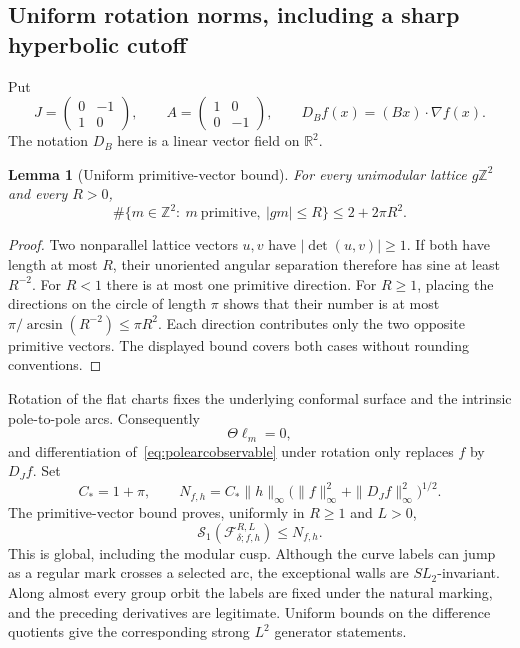 \documentclass[11pt,a4paper]{article}
\numberwithin{equation}{section}
\newtheorem{lemma}[theorem]{Lemma}
\theoremstyle{definition}
\theoremstyle{remark}
\newcommand{\RR}{\mathbb R}
\newcommand{\ZZ}{\mathbb Z}
\begin{document}
\subsection{Uniform rotation norms, including a sharp hyperbolic cutoff}
\label{subsec:polearcnorms}

Put
\[
 J=\begin{pmatrix}0&-1\\1&0\end{pmatrix},\qquad
 A=\begin{pmatrix}1&0\\0&-1\end{pmatrix},\qquad
 D_Bf(x)=(Bx)\cdot\nabla f(x).
\]
The notation $D_B$ here is a linear vector field on $\RR^2$.

\begin{lemma}[Uniform primitive-vector bound]
\label{lem:polearcprimitivebound}
For every unimodular lattice $g\ZZ^2$ and every $R>0$,
\begin{equation}
 \#\{m\in\ZZ^2:\ m\ \mathrm{primitive},\ |gm|\leq R\}
 \leq 2+2\pi R^2.
 \label{eq:polearcprimitivebound}
\end{equation}
\end{lemma}

\begin{proof}
Two nonparallel lattice vectors $u,v$ have $|\det(u,v)|\geq1$.
If both have length at most $R$, their unoriented angular separation
therefore has sine at least $R^{-2}$. For $R<1$ there is at most one
primitive direction. For $R\geq1$, placing the directions on the circle
of length $\pi$ shows that their number is at most
$\pi/\arcsin(R^{-2})\leq\pi R^2$. Each direction contributes only
the two opposite primitive vectors. The displayed bound covers both
cases without rounding conventions.
\end{proof}

Rotation of the flat charts fixes the underlying conformal surface and
the intrinsic pole-to-pole arcs. Consequently
\[
 \Theta\ell_m=0,
\]
and differentiation of~\eqref{eq:polearcobservable} under rotation
only replaces $f$ by $D_Jf$. Set
\[
 C_*=1+\pi,\qquad
 N_{f,h}=C_*\|h\|_\infty
             \bigl(\|f\|_\infty^2+\|D_Jf\|_\infty^2\bigr)^{1/2}.
\]
The primitive-vector bound proves, uniformly in $R\geq1$ and $L>0$,
\begin{equation}
 \mathcal S_1(\mathcal F_{\delta;f,h}^{R,L})\leq N_{f,h}.
 \label{eq:polearcuniformS1}
\end{equation}
This is global, including the modular cusp. Although the curve labels
can jump as a regular mark crosses a selected arc, the exceptional walls
are $SL_2$-invariant. Along almost every group orbit the labels are fixed
under the natural marking, and the preceding derivatives are legitimate.
Uniform bounds on the difference quotients give the corresponding strong
$L^2$ generator statements.
\end{document}
